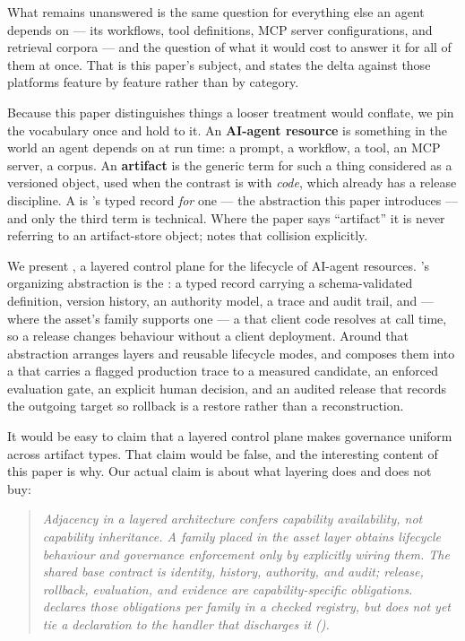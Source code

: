 What remains unanswered is the same question for everything else an agent depends
on --- its workflows, tool definitions, MCP server configurations, and retrieval
corpora --- and the question of what it would cost to answer it for all of them at
once. That is this paper's subject, and  states the delta
against those platforms feature by feature rather than by category.

 Because this paper distinguishes
things a looser treatment would conflate, we pin the vocabulary once and hold to it.
An \textbf{AI-agent resource} is something in the world an agent depends on at run
time: a prompt, a workflow, a tool, an MCP server, a corpus. An \textbf{artifact} is
the generic term for such a thing considered as a versioned object, used when the
contrast is with \emph{code}, which already has a release discipline. A
\textbf{\gasset} is \sys's typed record \emph{for} one --- the abstraction this paper
introduces --- and only the third term is technical. Where the paper says
``artifact'' it is never referring to an \mlflow{} artifact-store object;
 notes that collision explicitly.

 We present \sysbare{}, a layered control plane for the
lifecycle of AI-agent resources. \sys{}'s organizing abstraction is the
\emph{\gasset}: a typed record carrying a schema-validated definition, version
history, an authority model, a trace and audit trail, and --- where the asset's
family supports one --- a \livetarget{} that client code resolves at call time,
so a release changes behaviour without a client deployment. Around that
abstraction \sys arranges \statLayersW{} layers and \statModesW{} reusable lifecycle
modes, and composes them into a \chainname{} that carries a flagged production
trace to a measured candidate, an enforced evaluation gate, an explicit human
decision, and an audited release that records the outgoing target so rollback is a
restore rather than a reconstruction.

 It would be easy to claim that a
layered control plane makes governance uniform across artifact types. That claim
would be false, and the interesting content of this paper is why. Our actual
claim is about what layering does and does not buy:

\begin{quote}\itshape
Adjacency in a layered architecture confers capability \emph{availability}, not
capability \emph{inheritance}. A family placed in the asset layer obtains
lifecycle behaviour and governance enforcement only by explicitly wiring them.
The shared base contract is identity, history, authority, and audit; release,
rollback, evaluation, and evidence are capability-specific obligations. \sys
declares those obligations per family in a checked registry, but does not yet tie a
declaration to the handler that discharges it ().
\end{quote}

